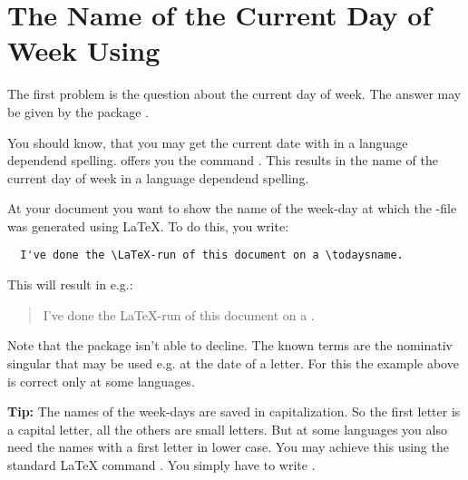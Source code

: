 \section{The Name of the Current Day of Week Using }
\label{sec:sec:datetime.scrdate}

The first problem is the question about the current day of week. The answer
may be given by the package .

\begin{Declaration}
\end{Declaration}%
%
You should know, that you may get the current date with
 in a language dependend
spelling.  offers you the command . This
results in the name of the current day of week in a language dependend
spelling.

\begin{Example}
  At your document you want to show the name of the week-day at which
  the -file was generated using \LaTeX. To do this, you
  write:
\begin{lstlisting}
  I've done the \LaTeX-run of this document on a \todaysname.
\end{lstlisting}
  This will result in e.g.:
  \begin{quote}
    I've done the \LaTeX-run of this document on a \todaysname.
  \end{quote}
\end{Example}

Note that the package isn't able to decline. The known terms are the nominativ
singular that may be used e.g. at the date of a letter. For this the example
above is correct only at some languages.

\begin{Explain}
  \textbf{Tip:} The names of the week-days are saved in
  capitalization. So the first letter is a capital letter, all the
  others are small letters. But at some languages you also need the
  names with a first letter in lower case. You may achieve this using
  the standard \LaTeX{} command . You simply have
  to write .
\end{Explain}

